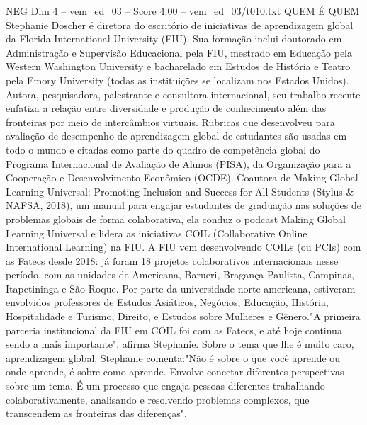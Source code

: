 \begin{textsample}{NEG Dim 4 – vem\_ed\_03 – Score 4.00 – vem\_ed\_03/t010.txt}  \label{ex:f4_neg_114}
QUEM É QUEM Stephanie Doscher é diretora do escritório de iniciativas de aprendizagem global da Florida International University (FIU).
Sua formação inclui doutorado em Administração e Supervisão Educacional pela FIU, mestrado em Educação pela Western Washington University e bacharelado em Estudos de História e Teatro pela Emory University (todas as instituições se localizam nos Estados Unidos).
Autora, pesquisadora, palestrante e consultora internacional, seu trabalho recente enfatiza a relação entre diversidade e produção de conhecimento além das fronteiras por meio de intercâmbios virtuais.
Rubricas que desenvolveu para avaliação de desempenho de aprendizagem global de estudantes são usadas em todo o mundo e citadas como parte do quadro de competência global do Programa Internacional de Avaliação de Alunos (PISA), da Organização para a Cooperação e Desenvolvimento Econômico (OCDE).
Coautora de Making Global Learning Universal: Promoting Inclusion and Success for All Students (Stylus \& NAFSA, 2018), um manual para engajar estudantes de graduação nas soluções de problemas globais de forma colaborativa, ela conduz o podcast Making Global Learning Universal e lidera as iniciativas COIL (Collaborative Online International Learning) na FIU.
A FIU vem desenvolvendo COILs (ou PCIs) com as Fatecs desde 2018: já foram 18 projetos colaborativos internacionais nesse período, com as unidades de Americana, Barueri, Bragança Paulista, Campinas, Itapetininga e São Roque.
Por parte da universidade norte-americana, estiveram envolvidos professores de Estudos Asiáticos, Negócios, Educação, História, Hospitalidade e Turismo, Direito, e Estudos sobre Mulheres e Gênero."A primeira parceria institucional da FIU em COIL foi com as Fatecs, e até hoje continua sendo a mais importante", afirma Stephanie.
Sobre o tema que lhe é muito caro, aprendizagem global, Stephanie comenta:"Não é sobre o que você aprende ou onde aprende, é sobre como aprende.
Envolve conectar diferentes perspectivas sobre um tema.
É um processo que engaja pessoas diferentes trabalhando colaborativamente, analisando e resolvendo problemas complexos, que transcendem as fronteiras das diferenças".

\end{textsample}
